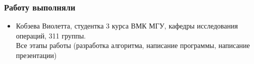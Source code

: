 \documentclass{beamer}
\begin{document}
	\begin{frame}
		\frametitle{Работу выполняли}
		\begin{itemize}
			\item Кобзева Виолетта, студентка 3 курса ВМК МГУ, кафедры исследования операций, 311 группы. \\Все этапы работы (разработка алгоритма, написание программы, написание презентации)
		\end{itemize}	
	\end{frame}
\end{document}
